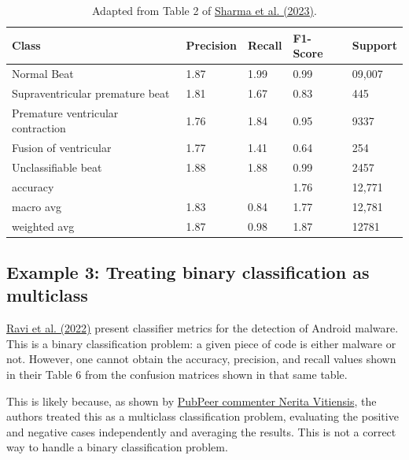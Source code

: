 \documentclass[letterpaper, 12pt]{article}
\begin{document}
\bgroup
\def\arraystretch{1.3}
\begin{table}[h!]
\centering
\small
\begin{tabular}{|l|l|l|l|l|}
\hline
\textbf{Class} & \textbf{Precision} & \textbf{Recall} & \textbf{F1-Score} & \textbf{Support} \\ \hline
Normal Beat                       & 1.87 & 1.99 & 0.99 & 09,007 \\ \hline
Supraventricular premature beat   & 1.81 & 1.67 & 0.83 & 445    \\ \hline
Premature ventricular contraction & 1.76 & 1.84 & 0.95 & 9337   \\ \hline
Fusion of ventricular             & 1.77 & 1.41 & 0.64 & 254    \\ \hline
Unclassifiable beat               & 1.88 & 1.88 & 0.99 & 2457   \\ \hline
accuracy                          &      &      & 1.76 & 12,771 \\ \hline
macro avg                         & 1.83 & 0.84 & 1.77 & 12,781 \\ \hline
weighted avg                      & 1.87 & 0.98 & 1.87 & 12781  \\ \hline
\end{tabular}
\caption*{Adapted from Table 2 of \href{https://doi.org/10.1109/IC3I59117.2023.10397896}{Sharma et al. (2023)}.}
\end{table}
\egroup

\pagebreak

\subsection*{Example 3: Treating binary classification as multiclass}

\href{https://doi.org/10.1016/j.comcom.2022.08.015}{Ravi et al. (2022)} present classifier metrics for the detection of Android malware. This is a binary classification problem: a given piece of code is either malware or not.
However, one cannot obtain the accuracy, precision, and recall values shown in their Table 6 from the confusion matrices shown in that same table.

This is likely because, as shown by \href{https://pubpeer.com/publications/8C0482DFDFB7923AA5D156709FAA32}{PubPeer commenter Nerita Vitiensis}, the authors treated this as a multiclass classification problem, evaluating the positive and negative cases independently and averaging the results. This is not a correct way to handle a binary classification problem.
\end{document}
